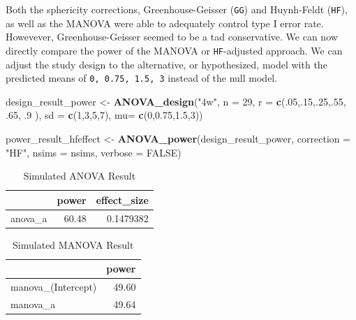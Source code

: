 \documentclass[]{book}
\newenvironment{Shaded}{\begin{snugshade}}{\end{snugshade}}
\newcommand{\DataTypeTok}[1]{\textcolor[rgb]{0.13,0.29,0.53}{#1}}
\newcommand{\DecValTok}[1]{\textcolor[rgb]{0.00,0.00,0.81}{#1}}
\newcommand{\FloatTok}[1]{\textcolor[rgb]{0.00,0.00,0.81}{#1}}
\newcommand{\KeywordTok}[1]{\textcolor[rgb]{0.13,0.29,0.53}{\textbf{#1}}}
\newcommand{\NormalTok}[1]{#1}
\newcommand{\OtherTok}[1]{\textcolor[rgb]{0.56,0.35,0.01}{#1}}
\newcommand{\StringTok}[1]{\textcolor[rgb]{0.31,0.60,0.02}{#1}}
\begin{document}
Both the sphericity corrections, Greenhouse-Geisser (\texttt{GG}) and Huynh-Feldt (\texttt{HF}), as well as the MANOVA were able to adequately control type I error rate. Howevever, Greenhouse-Geisser seemed to be a tad conservative. We can now directly compare the power of the MANOVA or \texttt{HF}-adjusted approach. We can adjust the study design to the alternative, or hypothesized, model with the predicted means of \texttt{0,\ 0.75,\ 1.5,\ 3} instead of the null model.

\begin{Shaded}
\begin{Highlighting}[]
\NormalTok{design_result_power <-}\StringTok{ }\KeywordTok{ANOVA_design}\NormalTok{(}\StringTok{"4w"}\NormalTok{,}
                              \DataTypeTok{n =} \DecValTok{29}\NormalTok{,}
                              \DataTypeTok{r =} \KeywordTok{c}\NormalTok{(.}\DecValTok{05}\NormalTok{,.}\DecValTok{15}\NormalTok{,.}\DecValTok{25}\NormalTok{,.}\DecValTok{55}\NormalTok{, }\FloatTok{.65}\NormalTok{, }\FloatTok{.9}
\NormalTok{                              ),}
                              \DataTypeTok{sd =} \KeywordTok{c}\NormalTok{(}\DecValTok{1}\NormalTok{,}\DecValTok{3}\NormalTok{,}\DecValTok{5}\NormalTok{,}\DecValTok{7}\NormalTok{),}
                              \DataTypeTok{mu=} \KeywordTok{c}\NormalTok{(}\DecValTok{0}\NormalTok{,}\FloatTok{0.75}\NormalTok{,}\FloatTok{1.5}\NormalTok{,}\DecValTok{3}\NormalTok{))}

\NormalTok{power_result_hfeffect <-}\StringTok{ }\KeywordTok{ANOVA_power}\NormalTok{(design_result_power, }\DataTypeTok{correction =} \StringTok{"HF"}\NormalTok{,}
                                     \DataTypeTok{nsims =}\NormalTok{ nsims, }\DataTypeTok{verbose =} \OtherTok{FALSE}\NormalTok{)}
\end{Highlighting}
\end{Shaded}

\begin{table}[!h]

\caption{\label{tab:unnamed-chunk-186}Simulated ANOVA Result}
\centering
\begin{tabular}{l|r|r}
\hline
  & power & effect\_size\\
\hline
anova\_a & 60.48 & 0.1479382\\
\hline
\end{tabular}
\end{table}
\begin{table}[!h]

\caption{\label{tab:unnamed-chunk-187}Simulated MANOVA Result}
\centering
\begin{tabular}{l|r}
\hline
  & power\\
\hline
manova\_(Intercept) & 49.60\\
\hline
manova\_a & 49.64\\
\hline
\end{tabular}
\end{table}
\end{document}
